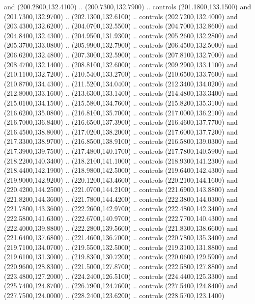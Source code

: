{\begin{scope}[y=0.80pt, x=0.80pt, yscale=-1, xscale=1, inner sep=0pt, outer sep=0pt, #1]
      and (200.2800,132.4100) .. (200.7300,132.7900) .. controls (201.1800,133.1500)
      and (201.7300,132.9700) .. (202.1300,132.6100) .. controls (202.7200,132.4000)
      and (203.4300,132.6200) .. (204.0700,132.5500) .. controls (204.7000,132.8600)
      and (204.8400,132.4300) .. (204.9500,131.9300) .. controls (205.2600,132.2800)
      and (205.3700,133.0800) .. (205.9900,132.7900) .. controls (206.4500,132.5000)
      and (206.6200,132.4800) .. (207.3000,132.5900) .. controls (207.8100,132.7000)
      and (208.4700,132.1400) .. (208.8100,132.6000) .. controls (209.2900,133.1100)
      and (210.1100,132.7200) .. (210.5400,133.2700) .. controls (210.6500,133.7600)
      and (210.8700,134.4300) .. (211.5200,134.0400) .. controls (212.3400,134.0200)
      and (212.8000,133.1600) .. (213.6300,133.1400) .. controls (214.4800,133.3400)
      and (215.0100,134.1500) .. (215.5800,134.7600) .. controls (215.8200,135.3100)
      and (216.6200,135.0800) .. (216.8100,135.7000) .. controls (217.0000,136.2100)
      and (216.7000,136.8400) .. (216.6500,137.3900) .. controls (216.4600,137.7700)
      and (216.4500,138.8000) .. (217.0200,138.2000) .. controls (217.6000,137.7200)
      and (217.3300,138.9700) .. (216.8500,138.9100) .. controls (216.5800,139.0300)
      and (217.3900,139.7500) .. (217.4800,140.1700) .. controls (217.7800,140.5900)
      and (218.2200,140.3400) .. (218.2100,141.1000) .. controls (218.9300,141.2300)
      and (218.4400,142.1900) .. (218.9800,142.5000) .. controls (219.6400,142.4300)
      and (219.9000,142.9200) .. (220.1200,143.4600) .. controls (220.2100,144.1600)
      and (220.4200,144.2500) .. (221.0700,144.2100) .. controls (221.6900,143.8800)
      and (221.8200,144.3600) .. (221.7800,144.4200) .. controls (222.3800,144.0300)
      and (221.7800,143.3600) .. (222.2600,142.9700) .. controls (222.4800,142.3400)
      and (222.5800,141.6300) .. (222.6700,140.9700) .. controls (222.7700,140.4300)
      and (222.4000,139.8800) .. (222.2800,139.5600) .. controls (221.8300,138.6600)
      and (221.6400,137.6800) .. (221.4600,136.7000) .. controls (220.7800,135.3400)
      and (219.7100,134.0700) .. (219.5500,132.5000) .. controls (219.3100,131.8800)
      and (219.6100,131.3000) .. (219.8300,130.7200) .. controls (220.0600,129.5900)
      and (220.9600,128.8300) .. (221.5000,127.8700) .. controls (222.5800,127.8800)
      and (223.4800,127.2000) .. (224.2400,126.5100) .. controls (224.4400,125.3300)
      and (225.7400,124.8700) .. (226.7900,124.7600) .. controls (227.5400,124.8400)
      and (227.7500,124.0000) .. (228.2400,123.6200) .. controls (228.5700,123.1400)

\end{scope}}

